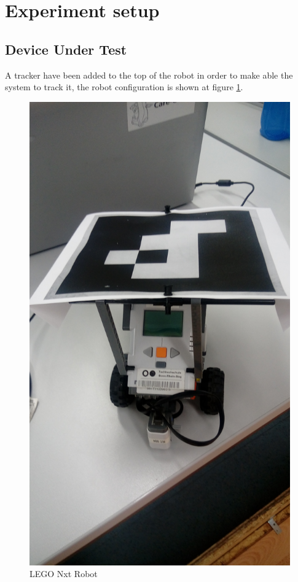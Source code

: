 \documentclass[10pt]{scrartcl}
\begin{document}
\section{Experiment setup}

\subsection{Device Under Test}

A tracker have been added to the top of the robot in order to make able the system to track it, the robot configuration is shown at figure \ref{fig:1}.

\begin{figure}[ht!]
\centering
\includegraphics[angle=-90,scale=0.05]{images/robotWithMarker}
\caption{LEGO Nxt Robot}
\label{fig:1}
\end{figure}
\end{document}
